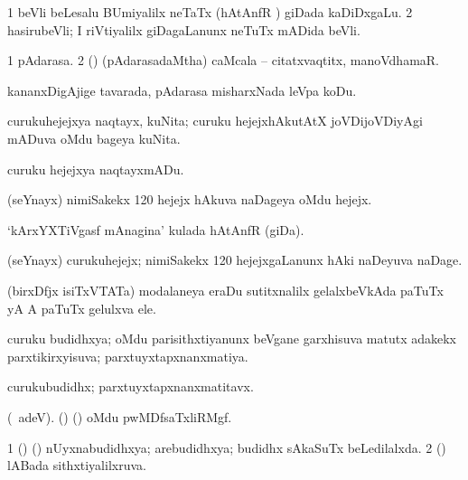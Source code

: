 \bentry
{}
\gl{\nA}
\expl{}
\bmng
\bnum
\num{1} beVli beLesalu BUmiyalilx neTaTx (hAtAnfR \mo) giDada kaDiDxgaLu. 
\num{2} hasirubeVli; I riVtiyalilx giDagaLanunx neTuTx mADida beVli. 
\enum
\emng
\eentry

\bentry
{}
\gl{\nA}
\bmng
\bnum
\num{1} pAdarasa. 
\num{2} (\rUpa) (pAdarasadaMtha) caMcala -- citatxvaqtitx, manoVdhamaR. 
\enum
\emng
\eentry

\bentry
{}
\gl{\sakirx}
\expl{}
\bmng
kananxDigAjige tavarada, pAdarasa misharxNada leVpa koDu. 
\emng
\eentry

\bentry
{}
\gl{\nA}
\bmng
curukuhejejxya naqtayx, kuNita; curuku hejejxhAkutAtX joVDijoVDiyAgi mADuva oMdu bageya kuNita. 
\emng
\eentry

\bentry
{}
\gl{\akirx}
\bmng
curuku hejejxya naqtayxmADu. 
\emng
\eentry

\bentry
{}
\gl{\nA}
\bmng
(seYnayx) nimiSakekx {\rm 120} hejejx hAkuva naDageya oMdu hejejx. 
\emng
\eentry

\bentry
{}
\gl{\nA}
\bmng
`kArxYXTiVgasf mAnagina' kulada hAtAnfR (giDa). 
\emng
\eentry

\bentry
{}
\gl{\nA}
\bmng
(seYnayx) curukuhejejx; nimiSakekx {\rm 120} hejejxgaLanunx hAki naDeyuva naDage. 
\emng
\eentry

\bentry
{}
\gl{\nA}
\bmng
(birxDfjx isiTxVTATa) modalaneya eraDu sutitxnalilx gelalxbeVkAda paTuTx yA A paTuTx gelulxva ele. 
\emng
\eentry

\bentry
{}
\gl{\gu}
\bmng
curuku budidhxya; oMdu parisithxtiyanunx beVgane garxhisuva matutx adakekx parxtikirxyisuva; parxtuyxtapxnanxmatiya. 
\emng
\eentry

\bentry
{}
\gl{\nA}
\bmng
curukubudidhx; parxtuyxtapxnanxmatitavx. 
\emng
\eentry

\bentry
{}
\gl{\nA}
\bmng
 (\bava\ adeV). (\birx) (\ashi) oMdu pwMDfsaTxliRMgf. 
\emng

\noindent
\gl{\pagu}
\bmng
\bnum
\num{1}   (\AseTxrXV) (\ashi) nUyxnabudidhxya; arebudidhxya; budidhx sAkaSuTx beLedilalxda. 
\num{2}  (\ashi) lABada sithxtiyalilxruva. 
\enum
\emng
\eentry

